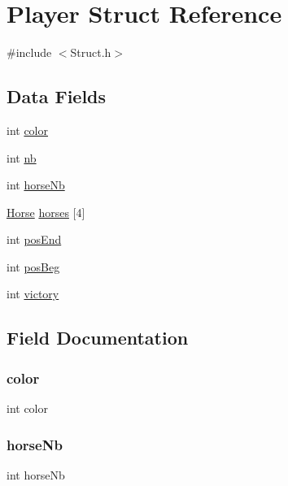 \hypertarget{struct_player}{}\section{Player Struct Reference}
\label{struct_player}


{\ttfamily \#include $<$Struct.\+h$>$}

\subsection*{Data Fields}
\begin{DoxyCompactItemize}
\item 
int \hyperlink{struct_player_a0fd02fb9277ffcb35a75066ffe95e8c7}{color}
\item 
int \hyperlink{struct_player_ab310c6afcc676eab3930dce2650511c0}{nb}
\item 
int \hyperlink{struct_player_a4e363714f99306666f5ee6d546f5e8fe}{horse\+Nb}
\item 
\hyperlink{struct_horse}{Horse} \hyperlink{struct_player_aebaeb813cc39287b8d51c8e329921872}{horses} \mbox{[}4\mbox{]}
\item 
int \hyperlink{struct_player_a8e270698bff1777ec85abad13dec9345}{pos\+End}
\item 
int \hyperlink{struct_player_a0bb30ad7c22691f6752ebd19291dde0a}{pos\+Beg}
\item 
int \hyperlink{struct_player_aa0f4ebda6ab8d3a392af7e069e8cdffa}{victory}
\end{DoxyCompactItemize}


\subsection{Field Documentation}
\mbox{\label{struct_player_a0fd02fb9277ffcb35a75066ffe95e8c7}} 
\subsubsection{\texorpdfstring{color}{color}}
{\footnotesize\ttfamily int color}

\mbox{\label{struct_player_a4e363714f99306666f5ee6d546f5e8fe}} 
\subsubsection{\texorpdfstring{horse\+Nb}{horseNb}}
{\footnotesize\ttfamily int horse\+Nb}

